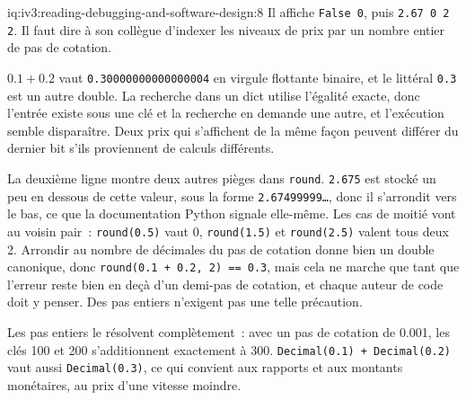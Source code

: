 \begin{solution}{iq:iv3:reading-debugging-and-software-design:8}
Il affiche \texttt{False 0}, puis \texttt{2.67 0 2 2}. Il faut dire à son collègue d'indexer les niveaux de prix par un nombre entier de pas de cotation.

$0.1 + 0.2$ vaut \texttt{0.30000000000000004} en virgule flottante binaire, et le littéral \texttt{0.3} est un autre double. La recherche dans un dict utilise l'égalité exacte, donc l'entrée existe sous une clé et la recherche en demande une autre, et l'exécution semble disparaître. Deux prix qui s'affichent de la même façon peuvent différer du dernier bit s'ils proviennent de calculs différents.

La deuxième ligne montre deux autres pièges dans \texttt{round}. \texttt{2.675} est stocké un peu en dessous de cette valeur, sous la forme \texttt{2.67499999\dots}, donc il s'arrondit vers le bas, ce que la documentation Python signale elle-même. Les cas de moitié vont au voisin pair~: \texttt{round(0.5)} vaut 0, \texttt{round(1.5)} et \texttt{round(2.5)} valent tous deux 2. Arrondir au nombre de décimales du pas de cotation donne bien un double canonique, donc \texttt{round(0.1 + 0.2, 2) == 0.3}, mais cela ne marche que tant que l'erreur reste bien en deçà d'un demi-pas de cotation, et chaque auteur de code doit y penser. Des pas entiers n'exigent pas une telle précaution.

Les pas entiers le résolvent complètement~: avec un pas de cotation de 0.001, les clés 100 et 200 s'additionnent exactement à 300. \texttt{Decimal(\textquotedbl{}0.1\textquotedbl{}) + Decimal(\textquotedbl{}0.2\textquotedbl{})} vaut aussi \texttt{Decimal(\textquotedbl{}0.3\textquotedbl{})}, ce qui convient aux rapports et aux montants monétaires, au prix d'une vitesse moindre.


\end{solution}

